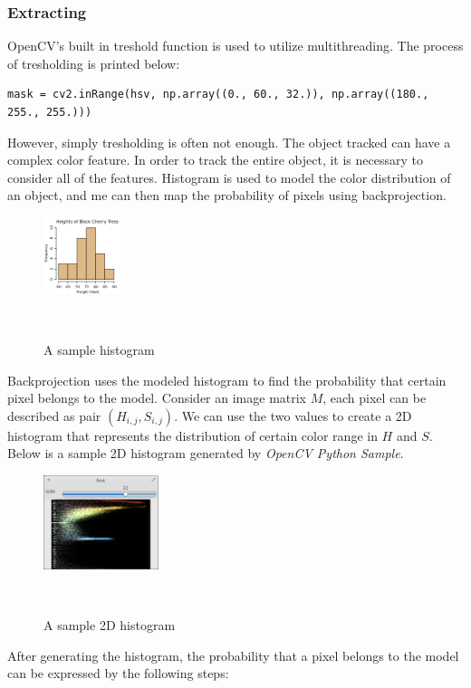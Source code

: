 \subsubsection{Extracting}
OpenCV's built in treshold function is used to utilize multithreading.
The process of tresholding is printed below:
\begin{lstlisting}
mask = cv2.inRange(hsv, np.array((0., 60., 32.)), np.array((180., 255., 255.)))
\end{lstlisting}
However, simply tresholding is often not enough. The object tracked can have a complex color feature. In order to track the entire object, it is necessary to consider all of the features. Histogram is used to model the color distribution of an object, and me can then map the probability of pixels using backprojection.\\
\begin{figure}[h!]

  \centering
    \includegraphics[width=0.2\textwidth]{../Pictures/histogram.JPG}
    \caption{A sample histogram\cite{cite5}}\\
\end{figure}
Backprojection uses the modeled histogram to find the probability that certain pixel belongs to the model. Consider an image matrix $M$, each pixel can be described as pair $(H_{i,j},S_{i,j})$. We can use the two values to create a 2D histogram that represents the distribution of certain color range in $H$ and $S$. Below is a sample 2D histogram generated by \emph{OpenCV Python Sample}.\\
\begin{figure}[h!]

  \centering
    \includegraphics[width=0.3\textwidth]{../Pictures/2dhist.png}
    \caption{A sample 2D histogram}\\
\end{figure}
After generating the histogram, the probability that a pixel belongs to the model can be expressed by the following steps:
